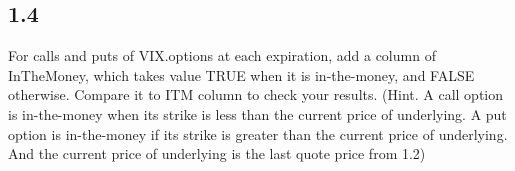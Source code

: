 \documentclass[
]{article}
\newenvironment{Shaded}{\begin{snugshade}}{\end{snugshade}}
\newcommand{\ConstantTok}[1]{\textcolor[rgb]{0.00,0.00,0.00}{#1}}
\newcommand{\ControlFlowTok}[1]{\textcolor[rgb]{0.13,0.29,0.53}{\textbf{#1}}}
\newcommand{\DecValTok}[1]{\textcolor[rgb]{0.00,0.00,0.81}{#1}}
\newcommand{\FloatTok}[1]{\textcolor[rgb]{0.00,0.00,0.81}{#1}}
\newcommand{\FunctionTok}[1]{\textcolor[rgb]{0.00,0.00,0.00}{#1}}
\newcommand{\NormalTok}[1]{#1}
\newcommand{\OtherTok}[1]{\textcolor[rgb]{0.56,0.35,0.01}{#1}}
\newcommand{\SpecialCharTok}[1]{\textcolor[rgb]{0.00,0.00,0.00}{#1}}
\begin{document}
\begin{Shaded}
\end{Shaded}

\hypertarget{section-3}{%
\subsection{1.4}\label{section-3}}

For calls and puts of VIX.options at each expiration, add a column of
InTheMoney, which takes value TRUE when it is in-the-money, and FALSE
otherwise. Compare it to ITM column to check your results. (Hint. A call
option is in-the-money when its strike is less than the current price of
underlying. A put option is in-the-money if its strike is greater than
the current price of underlying. And the current price of underlying is
the last quote price from 1.2)

\begin{Shaded}
\end{Shaded}
\end{document}
